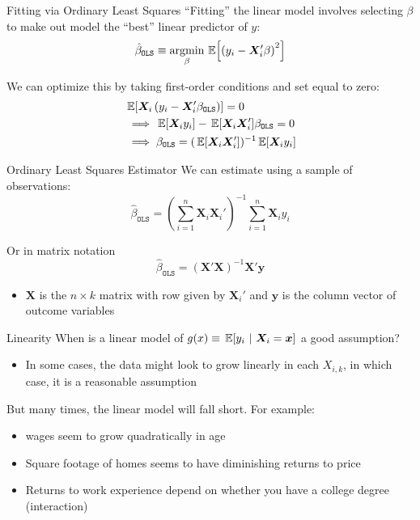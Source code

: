 \documentclass[aspectratio=169,t,11pt,table]{beamer}
\begin{document}
\begin{frame}{Fitting via Ordinary Least Squares}
  ``Fitting'' the linear model involves selecting $\beta$ to make out model the ``best'' linear predictor of $y$:
  $$
    \hat{\beta}_{\texttt{OLS}} \equiv \argmin_{\beta} \expec{\left( y_i - \bm{X}_i' \beta \right)^2}
  $$

  \bigskip\bigskip
  We can optimize this by taking first-order conditions and set equal to zero:
  \begin{align*}
    &\expec{ \bm{X}_i \left( y_i - \bm{X}_i' \beta_{\texttt{OLS}} \right) } = 0 \\
    &\implies \expec{ \bm{X}_i y_i } - \expec{\bm{X}_i \bm{X}_i'} \beta_{\texttt{OLS}} = 0 \\
    &\implies \beta_{\texttt{OLS}} = (\expec{\bm{X}_i \bm{X}_i'})^{-1} \expec{ \bm{X}_i y_i }
  \end{align*}
\end{frame}

\begin{frame}{Ordinary Least Squares Estimator}
  We can estimate using a sample of observations:
  $$
    \hat{\beta}_{\texttt{OLS}} = \left( \sum_{i=1}^n \bm{X}_i \bm{X}_i' \right)^{-1} \sum_{i=1}^n \bm{X}_i y_i
  $$

  \bigskip
  Or in matrix notation
  $$
    \hat{\beta}_{\texttt{OLS}} = (\bm{X}' \bm{X})^{-1} \bm{X}' \bm{y}
  $$
  \begin{itemize}
    \item $\bm{X}$ is the $n \times k$ matrix with row given by $\bm{X}_i'$ and $\bm{y}$ is the column vector of outcome variables
  \end{itemize}
\end{frame}

\begin{frame}{Linearity}
  When is a linear model of $g(x) \equiv \expec{y_i}{\bm{X}_i = \bm{x}}$ a good assumption?
  \begin{itemize}
    \item In some cases, the data might look to grow linearly in each $X_{i,k}$, in which case, it is a reasonable assumption
  \end{itemize}

  \bigskip
  But many times, the linear model will fall short. For example:
  \begin{itemize}
    \item wages seem to grow quadratically in age
    
    \medskip
    \item Square footage of homes seems to have diminishing returns to price

    \medskip
    \item Returns to work experience depend on whether you have a college degree (interaction)
  \end{itemize}
\end{frame}
\end{document}
